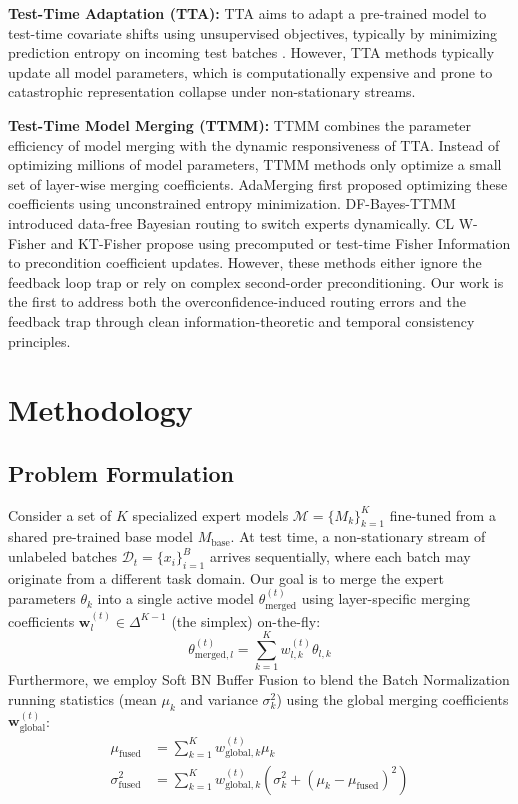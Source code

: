 \documentclass{article}
\theoremstyle{plain}
\theoremstyle{definition}
\theoremstyle{remark}
\begin{document}
\textbf{Test-Time Adaptation (TTA):} TTA aims to adapt a pre-trained model to test-time covariate shifts using unsupervised objectives, typically by minimizing prediction entropy on incoming test batches \cite{wang2020tent}. However, TTA methods typically update all model parameters, which is computationally expensive and prone to catastrophic representation collapse under non-stationary streams.

\textbf{Test-Time Model Merging (TTMM):} TTMM combines the parameter efficiency of model merging with the dynamic responsiveness of TTA. Instead of optimizing millions of model parameters, TTMM methods only optimize a small set of layer-wise merging coefficients. AdaMerging \cite{liang2023adamerging} first proposed optimizing these coefficients using unconstrained entropy minimization. DF-Bayes-TTMM \cite{anonymous2026dfbayes} introduced data-free Bayesian routing to switch experts dynamically. CL W-Fisher \cite{anonymous2026clwfisher} and KT-Fisher \cite{anonymous2026ktfisher} propose using precomputed or test-time Fisher Information to precondition coefficient updates. However, these methods either ignore the feedback loop trap or rely on complex second-order preconditioning. Our work is the first to address both the overconfidence-induced routing errors and the feedback trap through clean information-theoretic and temporal consistency principles.

\section{Methodology}
\label{submission-methodology}

\subsection{Problem Formulation}
Consider a set of $K$ specialized expert models $\mathcal{M} = \{M_k\}_{k=1}^K$ fine-tuned from a shared pre-trained base model $M_{\text{base}}$. At test time, a non-stationary stream of unlabeled batches $\mathcal{D}_t = \{x_i\}_{i=1}^B$ arrives sequentially, where each batch may originate from a different task domain. Our goal is to merge the expert parameters $\theta_k$ into a single active model $\theta_{\text{merged}}^{(t)}$ using layer-specific merging coefficients $\mathbf{w}_l^{(t)} \in \Delta^{K-1}$ (the simplex) on-the-fly:
\begin{equation}
    \theta_{\text{merged}, l}^{(t)} = \sum_{k=1}^K w_{l, k}^{(t)} \theta_{l, k}
\end{equation}
Furthermore, we employ Soft BN Buffer Fusion \cite{anonymous2026dfbayes} to blend the Batch Normalization running statistics (mean $\mu_k$ and variance $\sigma_k^2$) using the global merging coefficients $\mathbf{w}_{\text{global}}^{(t)}$:
\begin{align}
    \mu_{\text{fused}} &= \sum_{k=1}^K w_{\text{global}, k}^{(t)} \mu_k \\
    \sigma_{\text{fused}}^2 &= \sum_{k=1}^K w_{\text{global}, k}^{(t)} \left( \sigma_k^2 + (\mu_k - \mu_{\text{fused}})^2 \right)
\end{align}
\end{document}
